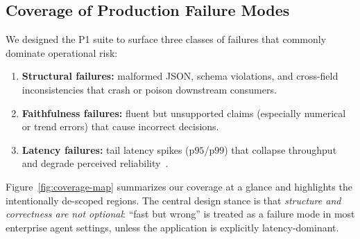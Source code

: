 \documentclass[11pt]{article}
\newcommand{\pninetyfive}{\ensuremath{\mathrm{p95}}}
\newcommand{\pninetynine}{\ensuremath{\mathrm{p99}}}
\begin{document}
\subsection{Coverage of Production Failure Modes}

We designed the P1 suite to surface three classes of failures that commonly dominate operational risk:

\begin{enumerate}[leftmargin=12pt]
    \item \textbf{Structural failures:} malformed JSON, schema violations, and cross-field inconsistencies that crash or poison downstream consumers.
    \item \textbf{Faithfulness failures:} fluent but unsupported claims (especially numerical or trend errors) that cause incorrect decisions.
    \item \textbf{Latency failures:} tail latency spikes (\pninetyfive/\pninetynine) that collapse throughput and degrade perceived reliability~\citep{dean2013tail}.
\end{enumerate}

Figure~\ref{fig:coverage-map} summarizes our coverage at a glance and highlights the intentionally de-scoped regions. The central design stance is that \emph{structure and correctness are not optional}: ``fast but wrong'' is treated as a failure mode in most enterprise agent settings, unless the application is explicitly latency-dominant.
\end{document}
